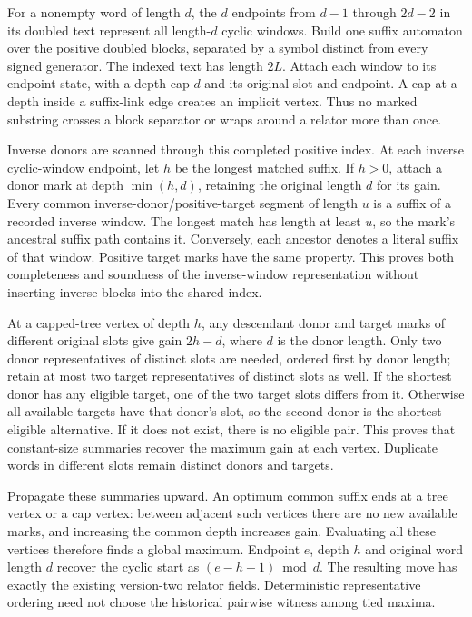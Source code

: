 For a nonempty word of length $d$, the $d$ endpoints from $d-1$ through
$2d-2$ in its doubled text represent all length-$d$ cyclic windows. Build
one suffix automaton over the positive doubled blocks, separated by a
symbol distinct from every signed generator. The indexed text has length
$2L$. Attach each window to its endpoint state, with a depth cap $d$ and
its original slot and endpoint. A cap at a depth inside a suffix-link edge
creates an implicit vertex. Thus no marked substring crosses a block
separator or wraps around a relator more than once.

Inverse donors are scanned through this completed positive index. At each
inverse cyclic-window endpoint, let $h$ be the longest matched suffix.
If $h>0$, attach a donor mark at depth $\min(h,d)$, retaining the original
length $d$ for its gain. Every common inverse-donor/positive-target segment
of length $u$ is a suffix of a recorded inverse window. The longest match
has length at least $u$, so the mark's ancestral suffix path contains it.
Conversely, each ancestor denotes a literal suffix of that window. Positive
target marks have the same property. This proves both completeness and
soundness of the inverse-window representation without inserting inverse
blocks into the shared index.

At a capped-tree vertex of depth $h$, any descendant donor and target marks
of different original slots give gain $2h-d$, where $d$ is the donor length.
Only two donor representatives of distinct slots are needed, ordered first
by donor length; retain at most two target representatives of distinct slots
as well. If the shortest donor has any eligible target, one of the two target
slots differs from it. Otherwise all available targets have that donor's
slot, so the second donor is the shortest eligible alternative. If it does
not exist, there is no eligible pair. This proves that constant-size summaries
recover the maximum gain at each vertex. Duplicate words in different slots
remain distinct donors and targets.

Propagate these summaries upward. An optimum common suffix ends at a tree
vertex or a cap vertex: between adjacent such vertices there are no new
available marks, and increasing the common depth increases gain. Evaluating
all these vertices therefore finds a global maximum. Endpoint $e$, depth
$h$ and original word length $d$ recover the cyclic start as
$(e-h+1)\bmod d$. The resulting move has exactly the existing version-two
relator fields. Deterministic representative ordering need not choose the
historical pairwise witness among tied maxima.

